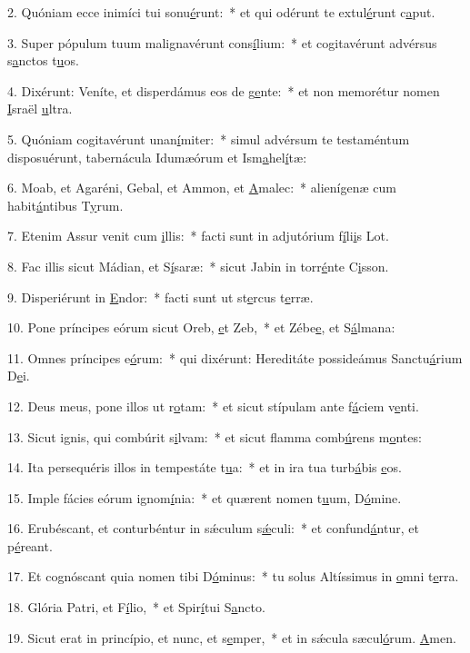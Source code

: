 2. Quóniam ecce inimíci tui sonu\uline{é}runt:~* et qui odérunt te extul\uline{é}runt c\uline{a}put.\par 
3. Super pópulum tuum malignavérunt cons\uline{í}lium:~* et cogitavérunt advérsus s\uline{a}nctos t\uline{u}os.\par 
4. Dixérunt: Veníte, et disperdámus eos de g\uline{e}nte:~* et non memorétur nomen \uline{I}sraël \uline{u}ltra.\par 
5. Quóniam cogitavérunt unan\uline{í}miter:~* simul advérsum te testaméntum disposuérunt, tabernácula Idumæórum et Ism\uline{a}hel\uline{í}tæ:\par 
6. Moab, et Agaréni, Gebal, et Ammon, et \uline{A}malec:~* alienígenæ cum habit\uline{á}ntibus T\uline{y}rum.\par 
7. Etenim Assur venit cum \uline{i}llis:~* facti sunt in adjutórium f\uline{í}li\uline{i}s Lot.\par 
8. Fac illis sicut Mádian, et S\uline{í}saræ:~* sicut Jabin in torr\uline{é}nte C\uline{i}sson.\par 
9. Disperiérunt in \uline{E}ndor:~* facti sunt ut st\uline{e}rcus t\uline{e}rræ.\par 
10. Pone príncipes eórum sicut Oreb, \uline{e}t Zeb,~* et Zébe\uline{e}, et S\uline{á}lmana:\par 
11. Omnes príncipes e\uline{ó}rum:~* qui dixérunt: Hereditáte possideámus Sanctu\uline{á}rium D\uline{e}i.\par 
12. Deus meus, pone illos ut r\uline{o}tam:~* et sicut stípulam ante f\uline{á}ciem v\uline{e}nti.\par 
13. Sicut ignis, qui combúrit s\uline{i}lvam:~* et sicut flamma comb\uline{ú}rens m\uline{o}ntes:\par 
14. Ita persequéris illos in tempestáte t\uline{u}a:~* et in ira tua turb\uline{á}bis \uline{e}os.\par 
15. Imple fácies eórum ignom\uline{í}nia:~* et quærent nomen t\uline{u}um, D\uline{ó}mine.\par 
16. Erubéscant, et conturbéntur in sǽculum s\uline{ǽ}culi:~* et confund\uline{á}ntur, et p\uline{é}reant.\par 
17. Et cognóscant quia nomen tibi D\uline{ó}minus:~* tu solus Altíssimus in \uline{o}mni t\uline{e}rra.\par 
18. Glória Patri, et F\uline{í}lio,~* et Spir\uline{í}tui S\uline{a}ncto.\par 
19. Sicut erat in princípio, et nunc, et s\uline{e}mper,~* et in sǽcula sæcul\uline{ó}rum. \uline{A}men.\par 
